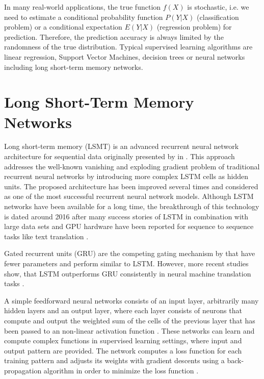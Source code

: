In many real-world applications, the true function $f(X)$ is stochastic, i.e. we need to estimate a conditional probability function $P(Y | X)$ (classification problem) or a conditional expectation $E(Y | X)$ (regression problem) for prediction.
Therefore, the prediction accuracy is always limited by the randomness of the true distribution.
Typical supervised learning algorithms are linear regression, Support Vector Machines, decision trees or neural networks including long short-term memory networks.
\section{Long Short-Term Memory Networks}

Long short-term memory (LSMT) is an advanced recurrent neural network architecture for sequential data originally presented by \citeauthor{DBLP:journals/neco/HochreiterS97} in \citeyear{DBLP:journals/neco/HochreiterS97}  \cite{DBLP:journals/neco/HochreiterS97}.
This approach addresses the well-known vanishing and exploding gradient problem \cite{DBLP:conf/icml/PascanuMB13}  of traditional recurrent neural networks by introducing more complex LSTM cells as hidden units.
The proposed architecture has been improved several times \cite{DBLP:journals/neco/GersSC00} \cite {DBLP:journals/tnn/GreffSKSS17} and considered as one of the most successful recurrent neural network models.
Although LSTM networks have been available for a long time, the breakthrough of this technology is dated around 2016 after many success stories of LSTM in combination with large data sets and GPU hardware have been reported for sequence to sequence tasks like text translation \cite{DBLP:journals/corr/WuSCLNMKCGMKSJL16}.

Gated recurrent units (GRU) \cite{DBLP:conf/emnlp/ChoMGBBSB14} are the competing gating mechanism by \citeauthor{DBLP:conf/emnlp/ChoMGBBSB14} that have fewer parameters and perform similar to LSTM.
However, more recent studies show, that LSTM outperforms GRU consistently in neural machine translation tasks \cite{DBLP:journals/corr/BritzGLL17}.

A simple feedforward neural networks consists of an input layer, arbitrarily many hidden layers and an output layer, where each layer consists of neurons that compute and output the weighted sum of the cells of the previous layer that has been passed to an non-linear activation function \cite{DBLP:journals/nn/Schmidhuber15}.
These networks can learn and compute complex functions in supervised learning settings, where input and output pattern are provided.
The network computes a loss function for each training pattern and adjusts its weights with gradient descents using a back-propagation algorithm in order to minimize the loss function \cite{rumelhart1986learning}.

